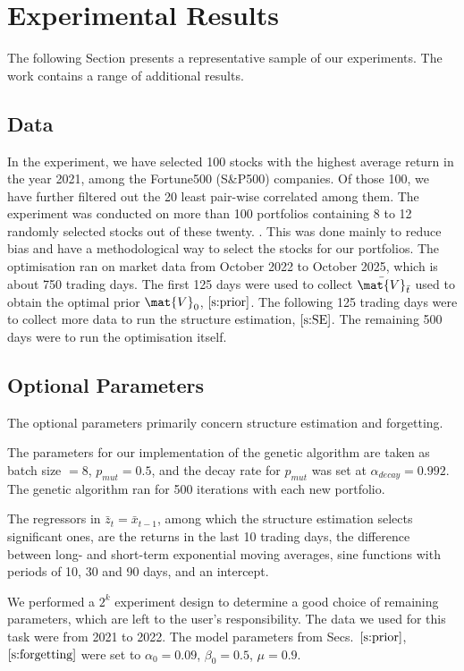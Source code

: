 \section{Experimental Results}
\label{s:experiments}
The following Section presents a representative sample of our experiments. The work \cite{Pro:26} contains a range of additional results.

\subsection{Data} \label{s:data}
In the experiment, we have selected 100 stocks with the highest average return in the year 2021, among the Fortune500 (S\&P500) companies. Of those 100, we have further filtered out the 20 least pair-wise correlated among them. The experiment was conducted on more than 100 portfolios containing 8 to 12 randomly selected stocks out of these twenty. . This was done mainly to reduce bias and have a methodological way to select the stocks for our portfolios.
The optimisation ran on market data from October 2022 to October 2025, which is about 750 trading days.  The first 125 days were used to collect $\bar{\mat{V}}_{\bar{t}}$ used to obtain the optimal prior $\mat{V}_0$, $\ref{s:prior}$. The following 125 trading days were to collect more data to run the structure estimation, $\ref{s:SE}$. The remaining 500 days were to run the optimisation itself.

\subsection{Optional Parameters} \label{s:options}
The optional parameters primarily concern structure estimation and forgetting.

The parameters for our implementation of the genetic algorithm are taken as batch size $=8$, $p_{mut} = 0.5$, and the decay rate for $p_{mut}$ was set at $\alpha_{decay}=0.992$. The genetic algorithm ran for 500 iterations with each new portfolio.

The regressors in $\bar{z}_{t}=\bar{x}_{t-1}$, among which the structure estimation selects significant ones, are the returns in the last 10 trading days, the difference between long- and short-term exponential moving averages, sine functions with periods of 10, 30 and 90 days, and an intercept.

We performed a $2^k$ experiment design \cite{4736103} to determine a good choice of remaining parameters, which are left to the user's responsibility. The data we used for this task were from 2021 to 2022. The model parameters from Secs.\ $\ref{s:prior}$, $\ref{s:forgetting}$ were set to $\alpha_0 = 0.09$, $\beta_0 = 0.5$, $\mu = 0.9$.


